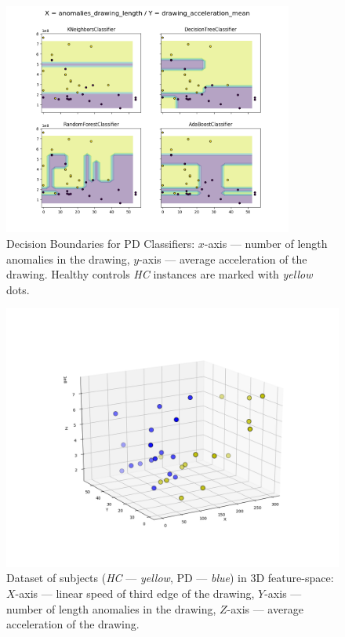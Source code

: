\begin{figure}[htb]
  \centering
    \includegraphics[width=0.85\textwidth, trim=0cm 1.5cm 0cm 0cm]
        {images/classifier/001}
    \caption{Decision Boundaries for PD Classifiers: $x$-axis --- number of length anomalies in the drawing, $y$-axis --- average acceleration of the drawing. Healthy controls \textit{HC} instances are marked with \textit{yellow} dots.}
    \label{classifier4}
\end{figure}

\begin{figure}[htb]
  \centering
    \includegraphics[width=1.0\textwidth, trim=2cm 2.5cm 2cm 3cm, clip=true]
        {images/classifier/004}
    \caption{Dataset of subjects (\textit{HC} --- \textit{yellow}, PD --- \textit{blue}) in 3D feature-space: 
    $X$-axis --- linear speed of third edge of the drawing,
    $Y$-axis --- number of length anomalies in the drawing, 
    $Z$-axis --- average acceleration of the drawing.}
    \label{3d}
\end{figure}